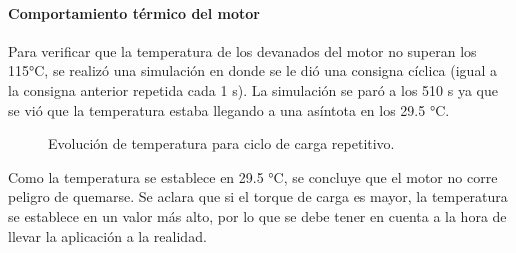 \documentclass[a4paper, 10pt, onecolumn,journal]{ieeeconf}
\begin{document}
\paragraph{\textbf{Comportamiento térmico del motor}} 
Para verificar que la temperatura de los devanados del motor no superan los 115°C, se realizó una simulación en donde se le dió una consigna cíclica (igual a la consigna anterior repetida cada 1 s). La simulación se paró a los 510 s ya que se vió que la temperatura estaba llegando a una asíntota en los 29.5 °C.
\begin{figure}[H]
	\centering
	\begin{adjustbox}{max width=\columnwidth}
	\end{adjustbox}
	\caption{Evolución de temperatura para ciclo de carga repetitivo.}
	\label{Evolución de temperatura para ciclo de carga repetitivo}
\end{figure}
Como la temperatura se establece en  29.5 °C, se concluye que el motor no corre peligro de quemarse. Se aclara que si el torque de carga es mayor, la temperatura se establece en un valor más alto, por lo que se debe tener en cuenta a la hora de llevar la aplicación a la realidad.
\end{document}
